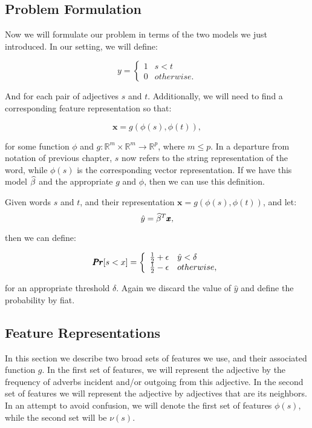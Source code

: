 \subsection{Problem Formulation}

Now we will formulate our problem in terms of the two models we just introduced. In our setting, we will define:

\[   
y = \left\{
\begin{array}{ll}
      1 & s < t \\
      0 & otherwise.
\end{array} 
\right. 
\]

And for each pair of adjectives $s$ and $t$. Additionally, we will need to find a corresponding feature representation so that:

	\[
		\pmb{x} = g(\phi(s), \phi(t)),
	\]

for some function $\phi$ and $g : \mathbb{R}^m \times \mathbb{R}^m \rightarrow \mathbb{R}^p$, where $m \leq p$. In a departure from notation of previous chapter, $s$ now refers to the string representation of the word, while $\phi(s)$ is the corresponding vector representation. If we have this model $\widehat{\mathcal{\beta}}$ and the appropriate $g$ and $\phi$, then we can use this definition.

\begin{definition}

Given words $s$ and $t$, and their representation $\pmb{x} = g(\phi(s), \phi(t))$, and let:
	\[
		\hat{y} = \widehat{\mathcal{\beta}}^{T} \pmb{x},
	\]

then we can define:

\[   
\pmb{Pr}[s < x ] = \left\{
\begin{array}{ll}
      \frac{1}{2} + \epsilon & \hat{y} < \delta \\
      \frac{1}{2} - \epsilon & otherwise,
\end{array} 
\right. 
\]

for an appropriate threshold $\delta$. Again we discard the value of $\hat{y}$ and define the probability by fiat.
\end{definition}

\subsection{Feature Representations}

In this section we describe two broad sets of features we use, and their associated function $g$. In the first set of features, we will represent the adjective by the frequency of adverbs incident and/or outgoing from this adjective. In the second set of features we will represent the adjective by adjectives that are its neighbors. In an attempt to avoid confusion, we will denote the first set of features $\phi(s)$, while the second set will be $\nu(s)$.

